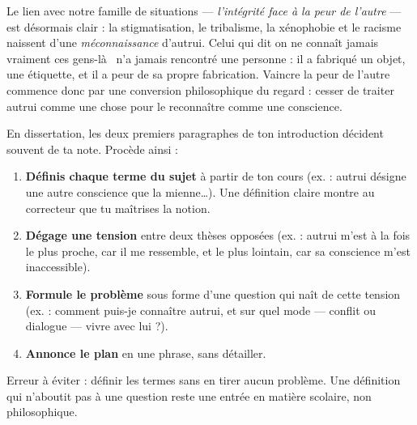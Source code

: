 \documentclass[11pt]{article}
\begin{document}
Le lien avec notre famille de situations — \emph{l'intégrité face à la peur de l'autre} — est désormais clair : la stigmatisation, le tribalisme, la xénophobie et le racisme naissent d'une \emph{méconnaissance} d'autrui. Celui qui dit \guillemotleft on ne connaît jamais vraiment ces gens-là \guillemotright\ n'a jamais rencontré une personne : il a fabriqué un objet, une étiquette, et il a peur de sa propre fabrication. Vaincre la peur de l'autre commence donc par une conversion philosophique du regard : cesser de traiter autrui comme une chose pour le reconnaître comme une conscience.

\begin{methode}
En dissertation, les deux premiers paragraphes de ton introduction décident souvent de ta note. Procède ainsi :
\begin{enumerate}
\item \textbf{Définis chaque terme du sujet} à partir de ton cours (ex. : \guillemotleft autrui désigne une autre conscience que la mienne\ldots \guillemotright). Une définition claire montre au correcteur que tu maîtrises la notion.
\item \textbf{Dégage une tension} entre deux thèses opposées (ex. : autrui m'est à la fois le plus proche, car il me ressemble, et le plus lointain, car sa conscience m'est inaccessible).
\item \textbf{Formule le problème} sous forme d'une question qui naît de cette tension (ex. : comment puis-je connaître autrui, et sur quel mode — conflit ou dialogue — vivre avec lui ?).
\item \textbf{Annonce le plan} en une phrase, sans détailler.
\end{enumerate}
Erreur à éviter : définir les termes sans en tirer aucun problème. Une définition qui n'aboutit pas à une question reste une entrée en matière scolaire, non philosophique.
\end{methode}
\end{document}
